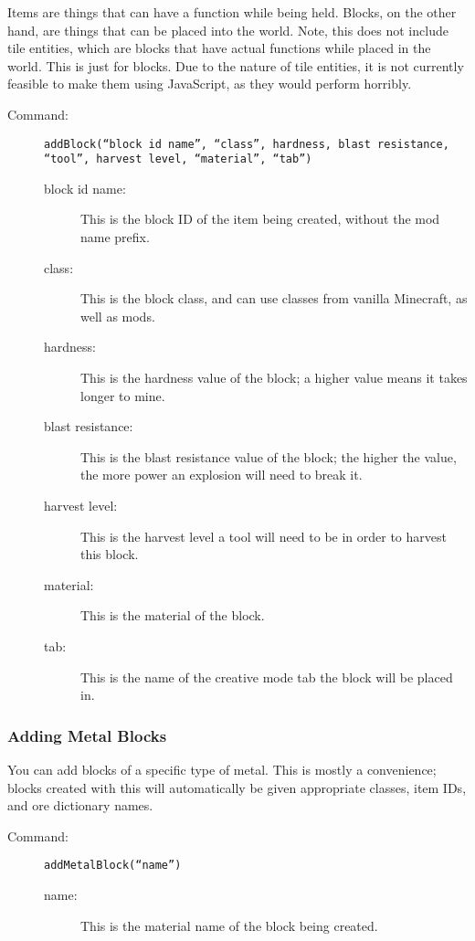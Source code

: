 \documentclass[letterpaper,titlepage,12pt]{article}
\begin{document}
Items are things that can have a function while being held.  Blocks, on the other hand, are things that can be placed into the world.  Note, this does not include tile entities, which are blocks that have actual functions while placed in the world.  This is just for blocks.  Due to the nature of tile entities, it is not currently feasible to make them using JavaScript, as they would perform horribly.

\begin{description}
\item[Command:] \texttt{addBlock(``block id name'', ``class'', hardness, blast resistance, ``tool'', harvest level, ``material'', ``tab'')
}
\begin{description}
\item [block id name:] This is the block ID of the item being created, without the mod name prefix.
\item [class:] This is the block class, and can use classes from vanilla Minecraft, as well as mods. 
\item [hardness:] This is the hardness value of the block; a higher value means it takes longer to mine. 
\item [blast resistance:] This is the blast resistance value of the block; the higher the value, the more power an explosion will need to break it.
\item [harvest level:] This is the harvest level a tool will need to be in order to harvest this block.
\item [material:] This is the material of the block.
\item [tab:] This  is the name of the creative mode tab the block will be placed in.
\end{description}
\end{description}

\subsubsection{Adding Metal Blocks}

You can add blocks of a specific type of metal.  This is mostly a convenience; blocks created with this will automatically be given appropriate classes, item IDs, and ore dictionary names.

\begin{description}
\item[Command:] \texttt{addMetalBlock(``name'')}
\begin{description}
\item [name:] This is the material name of the block being created.
\end{description}
\end{description}
\end{document}
